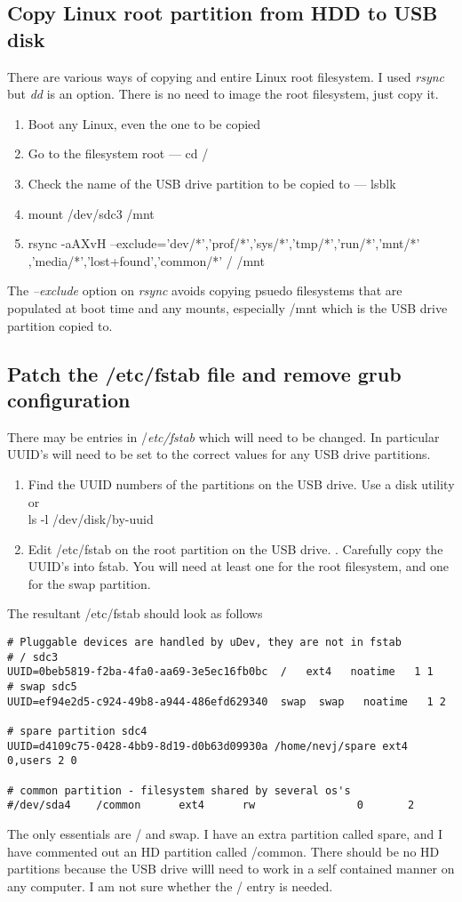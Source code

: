 \documentclass{article}  %
\begin{document}
\subsection{Copy Linux root partition from HDD to USB disk}
There are various ways of copying and entire Linux root filesystem. I used {\em rsync} but {\em dd} is an option. There is no need to image the root filesystem, just copy it.

\begin{enumerate}
\item Boot any Linux, even the one to be copied
\item Go to the filesystem root  --- cd  /
\item Check the name of the USB drive partition to be copied to  --- lsblk
\item mount /dev/sdc3 /mnt
\item rsync -aAXvH --exclude={'dev/*','prof/*','sys/*','tmp/*','run/*','mnt/*' \\
      ,'media/*','lost+found','common/*'} / /mnt
\end{enumerate}
The {\em --exclude} option on {\em rsync} avoids copying psuedo filesystems that are populated at boot time and any mounts, especially /mnt which is the USB drive partition copied to.

\subsection{Patch the /etc/fstab file and remove grub configuration}
There may be entries in {/\em etc/fstab} which will need to be changed. In particular UUID's will need to be set to the correct values for any USB drive partitions. 
\begin{enumerate}
\item Find the UUID numbers of the partitions on the USB drive. Use a disk utility or \\
  ls -l /dev/disk/by-uuid
\item Edit /etc/fstab on the root partition on the USB drive. . Carefully copy the UUID's into fstab. You will need at least one for the root filesystem, and one for the swap partition.
\end{enumerate}
 The resultant /etc/fstab should look as follows
\begin{verbatim}
# Pluggable devices are handled by uDev, they are not in fstab
# / sdc3
UUID=0beb5819-f2ba-4fa0-aa69-3e5ec16fb0bc  /   ext4   noatime   1 1 
# swap sdc5
UUID=ef94e2d5-c924-49b8-a944-486efd629340  swap  swap   noatime   1 2 

# spare partition sdc4
UUID=d4109c75-0428-4bb9-8d19-d0b63d09930a /home/nevj/spare ext4 0,users 2 0 

# common partition - filesystem shared by several os's
#/dev/sda4    /common      ext4      rw                0       2
\end{verbatim}
The only essentials are / and swap. I have an extra partition called spare, and I have commented out an HD partition called /common. There should be no HD partitions because the USB drive willl need to work in a self contained manner on any computer. I am not sure whether the / entry is needed.
\end{document}
